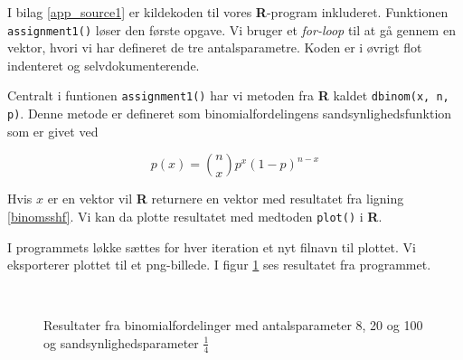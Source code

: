 {
I bilag \ref{app_source1} er kildekoden til vores \textbf{R}-program inkluderet.
Funktionen \texttt{assignment1()} løser den første opgave. Vi bruger et
\emph{for-loop} til at gå gennem en vektor, hvori vi har defineret de tre
antalsparametre. Koden er i øvrigt flot indenteret og selvdokumenterende.

Centralt i funtionen \texttt{assignment1()} har vi metoden fra
\textbf{R} kaldet \texttt{dbinom(x, n, p)}. Denne metode er defineret som
binomialfordelingens sandsynlighedsfunktion som er givet ved

\begin{equation}
    p(x) = \binom{n}{x}p^{x}(1 - p)^{n - x}
    \label{binomsshf}
\end{equation}

Hvis $x$ er en vektor vil \textbf{R} returnere en vektor med resultatet
fra ligning \ref{binomsshf}. Vi kan da plotte resultatet med medtoden
\texttt{plot()} i \textbf{R}.

I programmets løkke sættes for hver iteration et nyt filnavn til plottet.
Vi eksporterer plottet til et png-billede. I figur \ref{binom8_20_100}
ses resultatet fra programmet.

\begin{figure}[h]
    \centering
    \\
    \caption{Resultater fra binomialfordelinger med antalsparameter 8, 20
    og 100 og sandsynlighedsparameter $\frac{1}{4}$}
    \label{binom8_20_100}
\end{figure}

}
